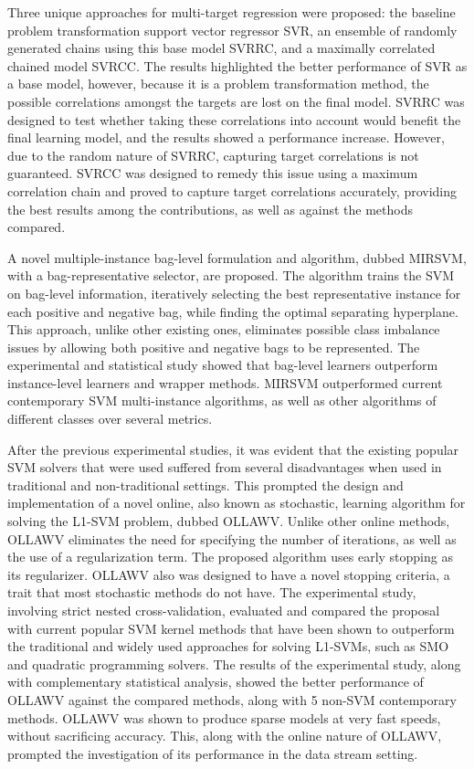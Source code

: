 \documentclass[reqno]{vcuthesis}
\numberwithin{equation}{chapter}
\begin{document}
Three unique approaches for multi-target regression were proposed: the baseline problem transformation support vector regressor SVR, an ensemble of randomly generated chains using this base model SVRRC, and a maximally correlated chained model SVRCC. The results highlighted the better performance of SVR as a base model, however, because it is a problem transformation method, the possible correlations amongst the targets are lost on the final model. SVRRC was designed to test whether taking these correlations into account would benefit the final learning model, and the results showed a performance increase. However, due to the random nature of SVRRC, capturing target correlations is not guaranteed. SVRCC was designed to remedy this issue using a maximum correlation chain and proved to capture target correlations accurately, providing the best results among the contributions, as well as against the methods compared. 

A novel multiple-instance bag-level formulation and algorithm, dubbed MIRSVM, with a bag-representative selector, are proposed. The algorithm trains the SVM on bag-level information, iteratively selecting the best representative instance for each positive and negative bag, while finding the optimal separating hyperplane. This approach, unlike other existing ones, eliminates possible class imbalance issues by allowing both positive and negative bags to be represented. The experimental and statistical study showed that bag-level learners outperform instance-level learners and wrapper methods. MIRSVM outperformed current contemporary SVM multi-instance algorithms, as well as other algorithms of different classes over several metrics.

After the previous experimental studies, it was evident that the existing popular SVM solvers that were used suffered from several disadvantages when used in traditional and non-traditional settings. This prompted the design and implementation of a novel online, also known as stochastic, learning algorithm for solving the L1-SVM problem, dubbed OLLAWV. Unlike other online methods, OLLAWV eliminates the need for specifying the number of iterations, as well as the use of a regularization term. The proposed algorithm uses early stopping as its regularizer. OLLAWV also was designed to have a novel stopping criteria, a trait that most stochastic methods do not have. The experimental study, involving strict nested cross-validation, evaluated and compared the proposal with current popular SVM kernel methods that have been shown to outperform the traditional and widely used approaches for solving L1-SVMs, such as SMO and quadratic programming solvers. The results of the experimental study, along with complementary statistical analysis, showed the better performance of OLLAWV against the compared methods, along with 5 non-SVM contemporary methods. OLLAWV was shown to produce sparse models at very fast speeds, without sacrificing accuracy. This, along with the online nature of OLLAWV, prompted the investigation of its performance in the data stream setting. 
\end{document}
